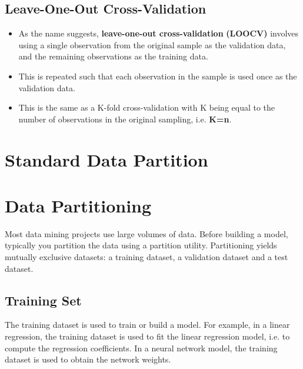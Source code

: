 \documentclass[a4paper,12pt]{article}
\begin{document}
\subsection*{Leave-One-Out Cross-Validation}
\begin{itemize}
\item As the name suggests, \textbf{leave-one-out cross-validation}  \textbf{(LOOCV)} involves using a single observation from the original sample as the validation data, and the remaining observations as the training data. 
\item This is repeated such that each observation in the sample is used once as the validation data. 
\item This is the same as a K-fold cross-validation with K being equal to the number of observations in the original sampling, i.e. \textbf{K=n}.
\end{itemize}



\newpage

\section{Standard Data Partition}


\section{Data Partitioning}
Most data mining projects use large volumes of data. Before building a model, typically you partition the data using a partition utility. Partitioning yields mutually exclusive datasets: a training dataset, a validation dataset and a test dataset.
\subsection*{Training Set}
The training dataset is used to train or build a model. For example, in a linear regression, the training dataset is used to fit the linear regression model, i.e. to compute the regression coefficients. In a neural network model, the training dataset is used to obtain the network weights.
\end{document}
